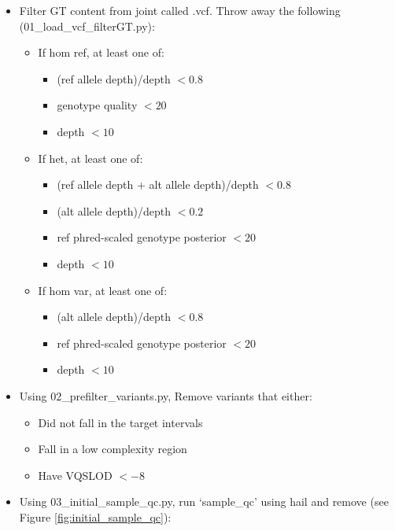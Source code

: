 \documentclass[12pt]{article}
\begin{document}
\graphicspath{{../../../QC_plots/sample_plots/}{../../../QC_plots/variant_plots/}}
\maketitle
\begin{itemize}
	\item Filter GT content from joint called .vcf. Throw away the following (01\_load\_vcf\_filterGT.py):
	\begin{itemize}
		\item If hom ref, at least one of:
		\begin{itemize}
			\item (ref allele depth)/depth $< 0.8$
			\item genotype quality $< 20$
			\item depth $< 10$
		\end{itemize}
		\item If het, at least one of:
		\begin{itemize}
			\item (ref allele depth + alt allele depth)/depth $< 0.8$
			\item (alt allele depth)/depth $< 0.2$
			\item ref phred-scaled genotype posterior $< 20$
			\item depth $< 10$
		\end{itemize}
		\item If hom var, at least one of:
		\begin{itemize}
			\item (alt allele depth)/depth $< 0.8$
			\item ref phred-scaled genotype posterior $< 20$
			\item depth $< 10$
		\end{itemize}
    \end{itemize}
    \item Using 02\_prefilter\_variants.py, Remove variants that either:
    \begin{itemize}
    	\item Did not fall in the target intervals
    	\item Fall in a low complexity region
    	\item Have VQSLOD $< -8$
    \end{itemize}
    \item Using 03\_initial\_sample\_qc.py, run `sample\_qc' using hail and remove (see Figure \ref{fig:initial_sample_qc}):
    \begin{itemize}

\end{itemize}
\end{itemize}
\end{document}
